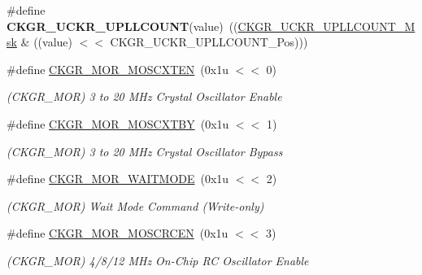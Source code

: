 \begin{DoxyCompactItemize}
\mbox{\label{group__SAMS70__PMC_ga8e7ef32a11772717dde8d372f1843ad4}} 
\#define {\bfseries C\+K\+G\+R\+\_\+\+U\+C\+K\+R\+\_\+\+U\+P\+L\+L\+C\+O\+U\+NT}(value)~((\mbox{\hyperlink{group__SAMV71__PMC_ga61f75d9c80b8106bfab1d3a066decf1f}{C\+K\+G\+R\+\_\+\+U\+C\+K\+R\+\_\+\+U\+P\+L\+L\+C\+O\+U\+N\+T\+\_\+\+Msk}} \& ((value) $<$$<$ C\+K\+G\+R\+\_\+\+U\+C\+K\+R\+\_\+\+U\+P\+L\+L\+C\+O\+U\+N\+T\+\_\+\+Pos)))
\item 
\mbox{\label{group__SAMS70__PMC_gab26d4c9e71b22e36955d8cf672d2b5ce}} 
\#define \mbox{\hyperlink{group__SAMS70__PMC_gab26d4c9e71b22e36955d8cf672d2b5ce}{C\+K\+G\+R\+\_\+\+M\+O\+R\+\_\+\+M\+O\+S\+C\+X\+T\+EN}}~(0x1u $<$$<$ 0)
\begin{DoxyCompactList}\small\item\em (C\+K\+G\+R\+\_\+\+M\+OR) 3 to 20 M\+Hz Crystal Oscillator Enable \end{DoxyCompactList}\item 
\mbox{\label{group__SAMS70__PMC_gae14b847f323d0724a35baa93f5ed7933}} 
\#define \mbox{\hyperlink{group__SAMS70__PMC_gae14b847f323d0724a35baa93f5ed7933}{C\+K\+G\+R\+\_\+\+M\+O\+R\+\_\+\+M\+O\+S\+C\+X\+T\+BY}}~(0x1u $<$$<$ 1)
\begin{DoxyCompactList}\small\item\em (C\+K\+G\+R\+\_\+\+M\+OR) 3 to 20 M\+Hz Crystal Oscillator Bypass \end{DoxyCompactList}\item 
\mbox{\label{group__SAMS70__PMC_ga0d4e91e3f7fa4bb51841ac6d9776a639}} 
\#define \mbox{\hyperlink{group__SAMS70__PMC_ga0d4e91e3f7fa4bb51841ac6d9776a639}{C\+K\+G\+R\+\_\+\+M\+O\+R\+\_\+\+W\+A\+I\+T\+M\+O\+DE}}~(0x1u $<$$<$ 2)
\begin{DoxyCompactList}\small\item\em (C\+K\+G\+R\+\_\+\+M\+OR) Wait Mode Command (Write-\/only) \end{DoxyCompactList}\item 
\mbox{\label{group__SAMS70__PMC_gaf83c14c0c2fc1939f462489c9e7ff28c}} 
\#define \mbox{\hyperlink{group__SAMS70__PMC_gaf83c14c0c2fc1939f462489c9e7ff28c}{C\+K\+G\+R\+\_\+\+M\+O\+R\+\_\+\+M\+O\+S\+C\+R\+C\+EN}}~(0x1u $<$$<$ 3)
\begin{DoxyCompactList}\small\item\em (C\+K\+G\+R\+\_\+\+M\+OR) 4/8/12 M\+Hz On-\/\+Chip RC Oscillator Enable \end{DoxyCompactList}\item 
$$
\end{DoxyCompactItemize}

